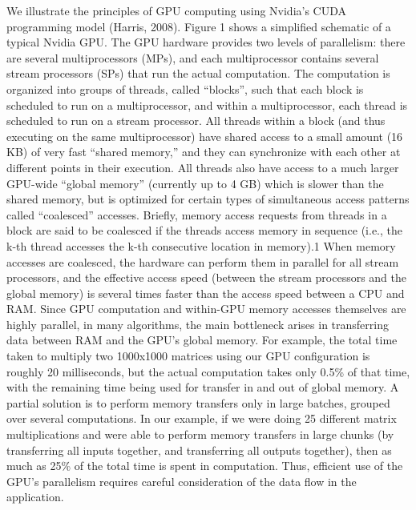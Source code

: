 \documentclass[7pt]{article}
\begin{document}
We illustrate the principles of GPU computing using Nvidia’s CUDA programming model (Harris, 2008). Figure 1 shows a simplified schematic of a typical Nvidia GPU. The GPU hardware provides two levels of parallelism: there are several multiprocessors (MPs), and each multiprocessor contains several stream processors (SPs) that run the actual computation. The computation is organized into groups of threads, called “blocks”, such that each block is scheduled to run on a multiprocessor, and within a multiprocessor, each thread is scheduled to run on a stream processor. All threads within a  block (and thus executing on the same multiprocessor) have shared access to a small amount (16 KB) of very fast “shared memory,” and they can synchronize with each other at different points in their execution. All threads also have access to a much larger GPU-wide “global memory” (currently up to 4 GB) which is slower than the shared memory, but is optimized for certain types of simultaneous access patterns called “coalesced” accesses. Briefly, memory access requests from threads in a block are said to be coalesced if the threads access memory in sequence (i.e., the k-th thread accesses the k-th consecutive location in memory).1 When memory accesses are coalesced, the hardware can perform them in parallel for all stream processors, and the effective access speed (between the stream processors and the global memory) is several times faster than the access speed between a CPU and RAM. Since GPU computation and within-GPU memory accesses themselves are highly parallel, in many algorithms, the main bottleneck arises in transferring data between RAM and the GPU’s global memory. For example, the total time taken to multiply two 1000x1000 matrices using our GPU configuration is roughly 20 milliseconds, but the actual computation takes only 0.5\% of that time, with the remaining time being used for transfer in and out of global memory. A partial solution is to perform memory transfers only in large batches, grouped over several computations. In our example, if we were doing 25 different matrix multiplications and were able to perform memory transfers in large chunks (by transferring all inputs together, and transferring all outputs together), then as much as 25\% of the total time is spent in computation. Thus, efficient use of the GPU’s parallelism requires careful consideration of the data flow in the application.
\end{document}
